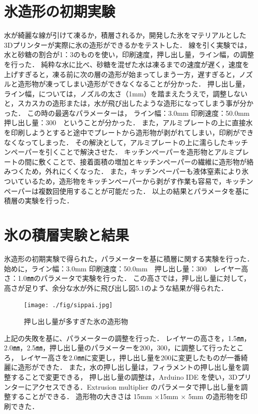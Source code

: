 \section{氷造形の初期実験}
\label{sec:paragraph}
水が綺麗な線が引けて凍るか，積層されるか，開発した氷をマテリアルとした3Dプリンターが実際に氷の造形ができるかをテストした．
線を引く実験では，水と砂糖の割合が1：3のものを使い，印刷速度，押し出し量，ライン幅，の調整を行った．
純粋な水に比べ、砂糖を混ぜた水は凍るまでの速度が遅く，速度を上げすぎると，凍る前に次の層の造形が始まってしまう一方，遅すぎると，ノズルと造形物が凍ってしまい造形ができなくなることが分かった．
押し出し量，ライン幅，については，ノズルの太さ（1mm）を踏まえたうえで，調整しないと，スカスカの造形または，水が飛び出したような造形になってしまう事が分かった．
この時の最適なパラメーターは， ライン幅：3.0mm 印刷速度：50.0mm　押し出し量：300　ということが分かった．
また，アルミプレートの上に直接水を印刷しようとすると途中でプレートから造形物が剥がれてしまい，印刷ができなくなってしまった．
その解決として，アルミプレートの上に濡らしたキッチンペーパーを引くことで解決させた．
キッチンペーパーを造形物とアルミプレートの間に敷くことで、接着面積の増加とキッチンペーパーの繊維に造形物が絡みつくため，外れにくくなった．
また，キッチンペーパーも液体窒素により氷ついているため，造形物をキッチンペーパーから剥がす作業も容易で，キッチンペーパーは複数回使用することが可能だった．
以上の結果とパラメータを基に積層の実験を行った．

\section{氷の積層実験と結果}
\label{sec:paragraph}
氷造形の初期実験で得られた，パラメーターを基に積層に関する実験を行った．
始めに，ライン幅：3.0mm 印刷速度：50.0mm　押し出し量：300　レイヤー高さ：1.0㎜のパラメータで実験を行った．
この高さでは，押し出し量に対して，高さが足りず、余分な水が外に飛び出し図5.1のような結果が得られた．

\begin{figure}[H]
    \centering
    \texttt{[image: ./fig/sippai.jpg]}
    \caption{押し出し量が多すぎた氷の造形物}
    \label{fig:printer2}
  \end{figure}

上記の失敗を基に、パラメーターの調整を行った．
レイヤーの高さを，1.5㎜，2.0㎜，2.5㎜，押し出し量のパラメーターを200，300，に調整して行ったところ，
レイヤー高さを2.0㎜に変更し，押し出し量を200に変更したものが一番綺麗に造形ができた．
また，水の押し出し量は，フィラメントの押し出し量を調整することで変更できる，
押し出し量の調整は，Arduino IDE を使い，3Dプリンターにアクセスできる．Extrusion multiplier のパラメータで押し出し量を調整することができる．
造形物の大きさは 15mm ×15mm × 5mm の造形物を印刷できた．


